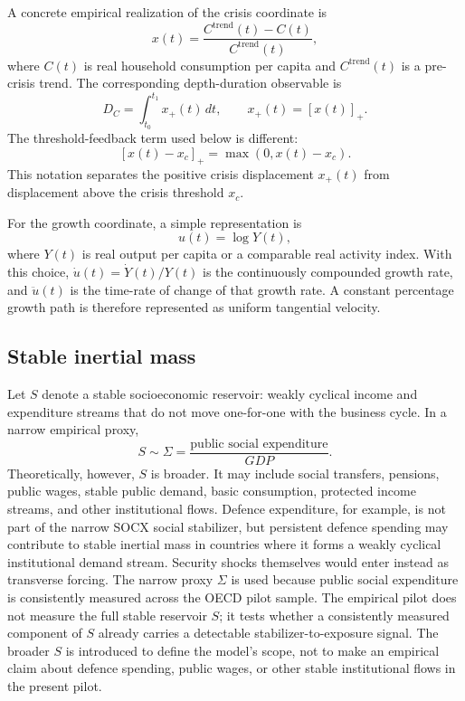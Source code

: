 \documentclass[11pt]{article}
\newcommand{\brpos}[1]{\left[#1\right]_+}
\begin{document}
A concrete empirical realization of the crisis coordinate is
\begin{equation}
x(t)=\frac{C^{\mathrm{trend}}(t)-C(t)}{C^{\mathrm{trend}}(t)},
\label{eq:xdef}
\end{equation}
where $C(t)$ is real household consumption per capita and $C^{\mathrm{trend}}(t)$ is a pre-crisis trend. The corresponding depth-duration observable is
\begin{equation}
D_C=\int_{t_0}^{t_1}x_+(t)\,dt,
\qquad
x_+(t)=\brpos{x(t)}.
\label{eq:DC}
\end{equation}
The threshold-feedback term used below is different:
\begin{equation}
\brpos{x(t)-x_c}=\max(0,x(t)-x_c).
\label{eq:thresholdterm}
\end{equation}
This notation separates the positive crisis displacement $x_+(t)$ from displacement above the crisis threshold $x_c$.

For the growth coordinate, a simple representation is
\begin{equation}
u(t)=\log Y(t),
\end{equation}
where $Y(t)$ is real output per capita or a comparable real activity index. With this choice, $\dot u(t)=\dot Y(t)/Y(t)$ is the continuously compounded growth rate, and $\ddot u(t)$ is the time-rate of change of that growth rate. A constant percentage growth path is therefore represented as uniform tangential velocity.

\subsection{Stable inertial mass}
Let $S$ denote a stable socioeconomic reservoir: weakly cyclical income and expenditure streams that do not move one-for-one with the business cycle. In a narrow empirical proxy,
\[
S\sim \Sigma=\frac{\text{public social expenditure}}{GDP}.
\]
Theoretically, however, $S$ is broader. It may include social transfers, pensions, public wages, stable public demand, basic consumption, protected income streams, and other institutional flows. Defence expenditure, for example, is not part of the narrow SOCX social stabilizer, but persistent defence spending may contribute to stable inertial mass in countries where it forms a weakly cyclical institutional demand stream. Security shocks themselves would enter instead as transverse forcing. The narrow proxy $\Sigma$ is used because public social expenditure is consistently measured across the OECD pilot sample. The empirical pilot does not measure the full stable reservoir $S$; it tests whether a consistently measured component of $S$ already carries a detectable stabilizer-to-exposure signal. The broader $S$ is introduced to define the model's scope, not to make an empirical claim about defence spending, public wages, or other stable institutional flows in the present pilot.
\end{document}
